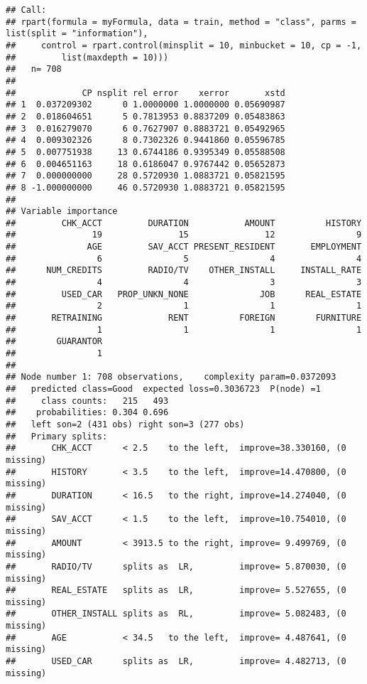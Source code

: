 \documentclass[
]{article}
\begin{document}
\begin{verbatim}
## Call:
## rpart(formula = myFormula, data = train, method = "class", parms = list(split = "information"), 
##     control = rpart.control(minsplit = 10, minbucket = 10, cp = -1, 
##         list(maxdepth = 10)))
##   n= 708 
## 
##             CP nsplit rel error    xerror       xstd
## 1  0.037209302      0 1.0000000 1.0000000 0.05690987
## 2  0.018604651      5 0.7813953 0.8837209 0.05483863
## 3  0.016279070      6 0.7627907 0.8883721 0.05492965
## 4  0.009302326      8 0.7302326 0.9441860 0.05596785
## 5  0.007751938     13 0.6744186 0.9395349 0.05588508
## 6  0.004651163     18 0.6186047 0.9767442 0.05652873
## 7  0.000000000     28 0.5720930 1.0883721 0.05821595
## 8 -1.000000000     46 0.5720930 1.0883721 0.05821595
## 
## Variable importance
##         CHK_ACCT         DURATION           AMOUNT          HISTORY 
##               19               15               12                9 
##              AGE         SAV_ACCT PRESENT_RESIDENT       EMPLOYMENT 
##                6                5                4                4 
##      NUM_CREDITS         RADIO/TV    OTHER_INSTALL     INSTALL_RATE 
##                4                4                3                3 
##         USED_CAR   PROP_UNKN_NONE              JOB      REAL_ESTATE 
##                2                1                1                1 
##       RETRAINING             RENT          FOREIGN        FURNITURE 
##                1                1                1                1 
##        GUARANTOR 
##                1 
## 
## Node number 1: 708 observations,    complexity param=0.0372093
##   predicted class=Good  expected loss=0.3036723  P(node) =1
##     class counts:   215   493
##    probabilities: 0.304 0.696 
##   left son=2 (431 obs) right son=3 (277 obs)
##   Primary splits:
##       CHK_ACCT      < 2.5    to the left,  improve=38.330160, (0 missing)
##       HISTORY       < 3.5    to the left,  improve=14.470800, (0 missing)
##       DURATION      < 16.5   to the right, improve=14.274040, (0 missing)
##       SAV_ACCT      < 1.5    to the left,  improve=10.754010, (0 missing)
##       AMOUNT        < 3913.5 to the right, improve= 9.499769, (0 missing)
##       RADIO/TV      splits as  LR,         improve= 5.870030, (0 missing)
##       REAL_ESTATE   splits as  LR,         improve= 5.527655, (0 missing)
##       OTHER_INSTALL splits as  RL,         improve= 5.082483, (0 missing)
##       AGE           < 34.5   to the left,  improve= 4.487641, (0 missing)
##       USED_CAR      splits as  LR,         improve= 4.482713, (0 missing)

\end{verbatim}
\end{document}
